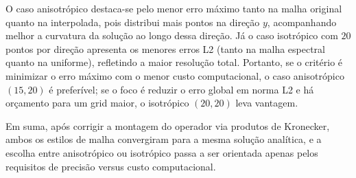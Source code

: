 O caso anisotrópico destaca-se pelo menor erro máximo tanto na malha original quanto na interpolada, pois distribui mais pontos na direção $y$, acompanhando melhor a curvatura da solução ao longo dessa direção. Já o caso isotrópico com $20$ pontos por direção apresenta os menores erros L2 (tanto na malha espectral quanto na uniforme), refletindo a maior resolução total. Portanto, se o critério é minimizar o erro máximo com o menor custo computacional, o caso anisotrópico $(15,20)$ é preferível; se o foco é reduzir o erro global em norma L2 e há orçamento para um grid maior, o isotrópico $(20,20)$ leva vantagem.

Em suma, após corrigir a montagem do operador via produtos de Kronecker, ambos os estilos de malha convergiram para a mesma solução analítica, e a escolha entre anisotrópico ou isotrópico passa a ser orientada apenas pelos requisitos de precisão versus custo computacional.
